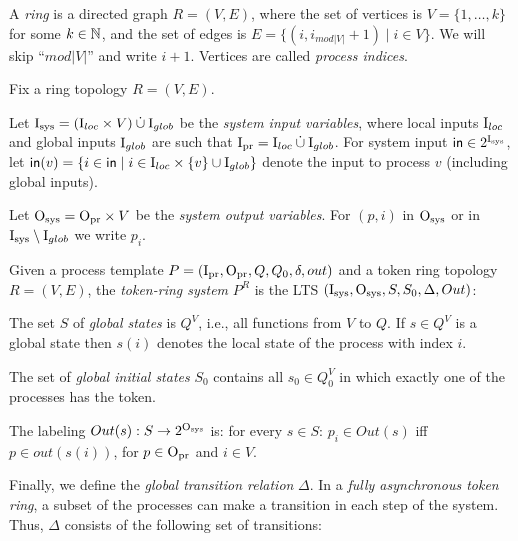 A {\em ring} is a directed graph $R = (V,E)$,
where the set of vertices is $V = \{ 1,\ldots,k\}$ for some $k \in \mathbb{N}$,
and the set of edges is $E = \{(i,i_{mod |V|}+1) \mid i\in V\}$.
We will skip ``$mod |V|$'' and write $i+1$.
Vertices are called {\em process indices}.


Fix a ring topology $R=(V,E)$.

Let ${\mathrm{I}_{\mathrm{sys}}} = (\mathrm{I}_{loc} \times V) \mathbin{\dot{\cup}} \mathrm{I}_{glob}$
be the \emph{system input variables},
where local inputs $\mathrm{I}_{loc}$ and global inputs $\mathrm{I}_{glob}$ are
such that ${\mathrm{I}_{\mathrm{pr}}} = \mathrm{I}_{loc} \mathbin{\dot{\cup}} \mathrm{I}_{glob}$.
For system input ${\sf in} \in 2^{\mathrm{I}_{\mathrm{sys}}}$,
let ${\sf in}(v) = \{ i \in {\sf in} \mid i\in \mathrm{I}_{loc}\times\{v\} \cup \mathrm{I}_{glob} \}$
denote the input to process $v$ (including global inputs).

Let ${\mathrm{O}_{\mathrm{sys}}} = {\mathrm{O}_{\mathrm{pr}}} \times V$ be the \emph{system output variables}. 
For $(p,i)$ in ${\mathrm{O}_{\mathrm{sys}}}$ or in ${\mathrm{I}_{\mathrm{sys}}}\setminus \mathrm{I}_{glob}$ we write $p_i$. 

Given a process template $P =  ({\mathrm{I}_{\mathrm{pr}}}, {\mathrm{O}_{\mathrm{pr}}}, Q, Q_0, \delta, out)$
and a token ring topology $R = (V,E)$,
the {\em token-ring system} $P^R$ is the LTS $({\mathrm{I}_{\mathrm{sys}}},{\mathrm{O}_{\mathrm{sys}}},S,S_0,\Delta,Out)$:

\li
\- The set $S$ of \emph{global states} is $Q^V$,
   i.e., all functions from $V$ to $Q$.
   If $s \in Q^V$ is a global state
   then $s(i)$ denotes the local state of the process with index $i$.

\- The set of \emph{global initial states} $S_0$ contains all $s_0 \in Q_0^V$
   in which exactly one of the processes has the token.

\- The labeling $Out(s): S \to 2^{\mathrm{O}_{\mathrm{sys}}}$ is:
   for every $s \in S$: $p_i \in Out(s)$ iff $p \in out(s(i))$, for $p \in {\mathrm{O}_{\mathrm{pr}}}$ and $i \in V$.
\il

Finally, we define the {\em global transition relation} $\Delta$. 
In a {\em fully asynchronous token ring},
a subset of the processes can make a transition in each step of the system.
Thus, $\Delta$ consists of the following set of transitions:

